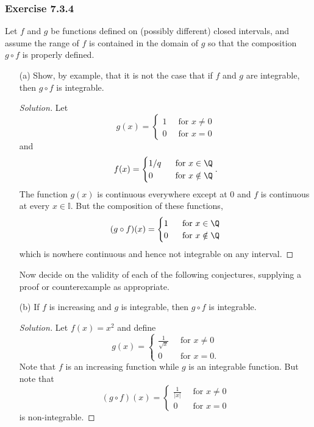 \subsubsection{Exercise 7.3.4} Let \( f  \) and \( g  \) be functions defined on (possibly different) closed intervals, and assume the range of \( f  \) is contained in the domain of \( g  \) so that the composition \( g \circ f   \) is properly defined.
\begin{enumerate}
    \item[(a)] Show, by example, that it is not the case that if \( f  \) and \( g  \) are integrable, then \( g \circ f  \) is integrable.
		\begin{proof}[Solution]
		Let 
		\[ g(x) = 
		\begin{cases}
			1 \ &\text{ for } x \neq 0 \\
			0 \ &\text{ for } x = 0 
		\end{cases}  \] and 
		\[  f(x) = 
		\begin{cases}
			1 / q \ &\text{ for } x \in \Q \\
			0  \ &\text{ for } x \notin \Q 
		\end{cases}.\] The function \( g(x)  \) is continuous everywhere except at \( 0  \) and \( f  \) is continuous at every \( x \in \mathbb{I} \). But the composition of these functions,
		\begin{align*}
			(g \circ f) (x) &= 
			\begin{cases}
				1 \ &\text{ for } x \in \Q \\
				0 \ &\text{ for } x \notin \Q 
			\end{cases}  \\
		\end{align*}
		which is nowhere continuous and hence not integrable on any interval.
		\end{proof}

		Now decide on the validity of each of the following conjectures, supplying a proof or counterexample as appropriate.
	\item[(b)] If \( f  \) is increasing and \( g  \) is integrable, then \( g \circ f  \) is integrable.
		\begin{proof}[Solution]
		Let \( f(x) = x^{2}  \) and define 
		\[  g(x) = 
		\begin{cases}
			\frac{ 1 }{ \sqrt{ x }  } \ &\text{ for } x \neq 0 \\ 
			0 \ &\text{ for } x = 0.
		\end{cases} \]
		Note that \( f  \) is an increasing function while \( g  \) is an integrable function. But note that 
		\[  (g \circ f)(x) = 
		\begin{cases}
			\frac{ 1 }{ | x |  } \ &\text{ for } x \neq 0 \\
			0 \ &\text{ for } x = 0
		\end{cases} \]
		is non-integrable.
		\end{proof}
		

\end{enumerate}
